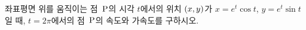 좌표평면 위를 움직이는 점~$\mathrm{P}$의 시각 $t$에서의 위치 $(x{,}\mkern3mu\mathopen{}y)$가 $x=e^t\cos t$, $y=e^t\sin t$일 때, $t=2\pi$에서의 점~$\mathrm{P}$의 속도와 가속도를 구하시오.
